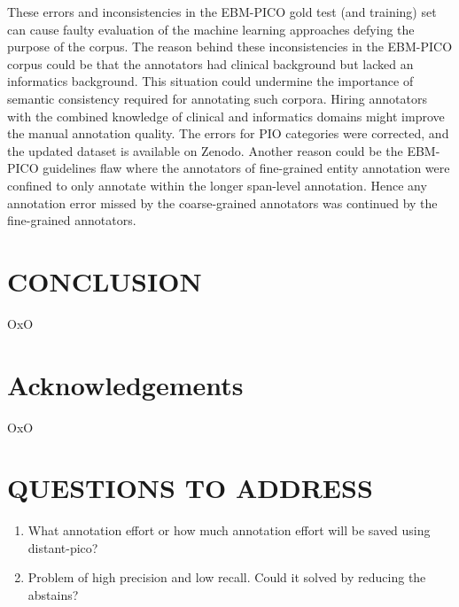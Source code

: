 \documentclass[10.7pt,]{article}
\begin{document}
These errors and inconsistencies in the EBM-PICO gold test (and training) set can cause faulty evaluation of the machine learning approaches defying the purpose of the corpus.
The reason behind these inconsistencies in the EBM-PICO corpus could be that the annotators had clinical background but lacked an informatics background.
This situation could undermine the importance of semantic consistency required for annotating such corpora.
Hiring annotators with the combined knowledge of clinical and informatics domains might improve the manual annotation quality.
The errors for PIO categories were corrected, and the updated dataset is available on Zenodo.
Another reason could be the EBM-PICO guidelines flaw where the annotators of fine-grained entity annotation were confined to only annotate within the longer span-level annotation.
Hence any annotation error missed by the coarse-grained annotators was continued by the fine-grained annotators.
%
%
%
\section{CONCLUSION}\label{conclusion}
%
OxO
%
%
%
\section{Acknowledgements}\label{acknowledgements}
%
OxO
%
%
%
\section{QUESTIONS TO ADDRESS}\label{ques}
%
\begin{enumerate}
    \item What annotation effort or how much annotation effort will be saved using distant-pico?
    \item Problem of high precision and low recall. Could it solved by reducing the abstains?
\end{enumerate}
%
%
%


\end{document}
